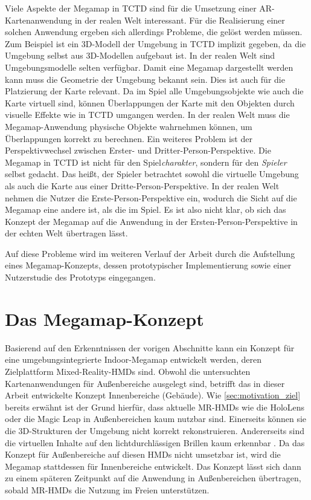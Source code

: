 Viele Aspekte der Megamap in TCTD sind für die Umsetzung einer AR-Kartenanwendung in der realen Welt interessant.
Für die Realisierung einer solchen Anwendung ergeben sich allerdings Probleme, die gelöst werden müssen.
Zum Beispiel ist ein 3D-Modell der Umgebung in TCTD implizit gegeben, da die Umgebung selbst aus 3D-Modellen aufgebaut ist.
In der realen Welt sind Umgebungsmodelle selten verfügbar.
Damit eine Megamap dargestellt werden kann muss die Geometrie der Umgebung bekannt sein.
Dies ist auch für die Platzierung der Karte relevant.
Da im Spiel alle Umgebungsobjekte wie auch die Karte virtuell sind, können Überlappungen der Karte mit den Objekten durch visuelle Effekte wie in TCTD umgangen werden.
In der realen Welt muss die Megamap-Anwendung physische Objekte wahrnehmen können, um Überlappungen korrekt zu berechnen.
Ein weiteres Problem ist der Perspektivwechsel zwischen Erster- und Dritter-Person-Perspektive.
Die Megamap in TCTD ist nicht für den Spiel\emph{charakter}, sondern für den \emph{Spieler} selbst gedacht.
Das heißt, der Spieler betrachtet sowohl die virtuelle Umgebung als auch die Karte aus einer Dritte-Person-Perspektive.
In der realen Welt nehmen die Nutzer die Erste-Person-Perspektive ein, wodurch die Sicht auf die Megamap eine andere ist, als die im Spiel.
Es ist also nicht klar, ob sich das Konzept der Megamap auf die Anwendung in der Ersten-Person-Perspektive in der echten Welt übertragen lässt.

Auf diese Probleme wird im weiteren Verlauf der Arbeit durch die Aufstellung eines Megamap-Konzepts, dessen prototypischer Implementierung sowie einer Nutzerstudie des Prototyps eingegangen.

\section{Das Megamap-Konzept}
Basierend auf den Erkenntnissen der vorigen Abschnitte kann ein Konzept für eine umgebungsintegrierte Indoor-Megamap entwickelt werden, deren Zielplattform Mixed-Reality-HMDs sind.
Obwohl die untersuchten Kartenanwendungen für Außenbereiche ausgelegt sind, betrifft das in dieser Arbeit entwickelte Konzept Innenbereiche (Gebäude).
Wie \autoref{sec:motivation_ziel} bereits erwähnt ist der Grund hierfür, dass aktuelle MR-HMDs wie die HoloLens oder die Magic Leap in Außenbereichen kaum nutzbar sind.
Einerseits können sie die 3D-Strukturen der Umgebung nicht korrekt rekonstruieren.
Andererseits sind die virtuellen Inhalte auf den lichtdurchlässigen Brillen kaum erkennbar \parencite{Schroeder2017, Strange2018}.
Da das Konzept für Außenbereiche auf diesen HMDs nicht umsetzbar ist, wird die Megamap stattdessen für Innenbereiche entwickelt.
Das Konzept lässt sich dann zu einem späteren Zeitpunkt auf die Anwendung in Außenbereichen übertragen, sobald MR-HMDs die Nutzung im Freien unterstützen.

